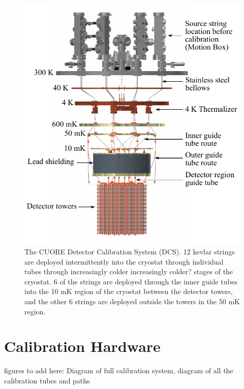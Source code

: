 \begin{figure}[htbp]
\includegraphics[width=\linewidth]{Figures/DCSintegration.pdf}
\caption[The CUORE Detector Calibration System (DCS).]{The CUORE Detector Calibration System (DCS). 12 kevlar strings are deployed intermittently into the cryostat through individual tubes through increasingly colder \color{red} increasingly colder? \color{black} stages of the cryostat. 6 of the strings are deployed through the inner guide tubes into the 10 mK region of the cryostat between the detector towers, and the other 6 strings are deployed outside the towers in the 50 mK region.}
\label{fig:DCSintegration}
\end{figure}

\section{Calibration Hardware}

figures to add here: Diagram of full calibration system, diagram of all the calibration tubes and paths

